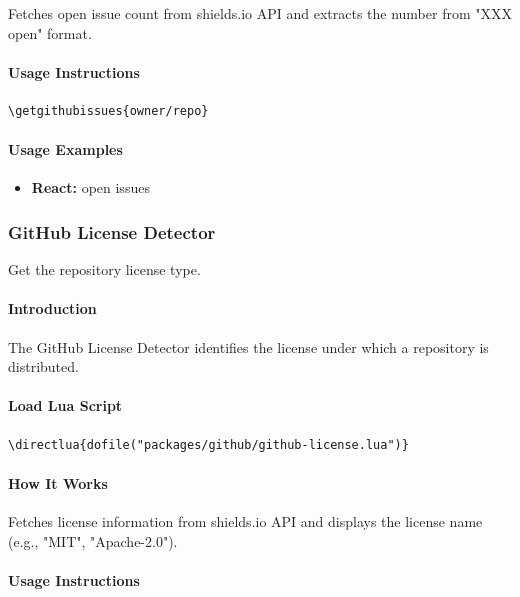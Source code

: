 \documentclass{article}
\begin{document}
Fetches open issue count from shields.io API and extracts the number from "XXX open" format.

\paragraph{Usage Instructions}

\begin{verbatim}
\getgithubissues{owner/repo}
\end{verbatim}

\paragraph{Usage Examples}

\begin{itemize}
    \item \textbf{React:}  open issues
\end{itemize}

\subsubsection{GitHub License Detector}

Get the repository license type.

\paragraph{Introduction}

The GitHub License Detector identifies the license under which a repository is distributed.

\paragraph{Load Lua Script}

\begin{verbatim}
\directlua{dofile("packages/github/github-license.lua")}
\end{verbatim}

\paragraph{How It Works}

Fetches license information from shields.io API and displays the license name (e.g., "MIT", "Apache-2.0").

\paragraph{Usage Instructions}
\end{document}

